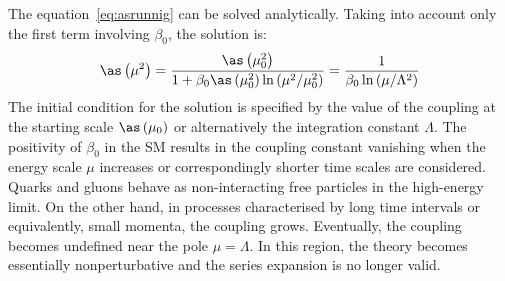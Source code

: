 The equation~\eqref{eq:asrunnig} can be solved analytically. Taking into account only the first term involving $\beta_0$, the solution is:
\begin{equation}
 \as\left(\mu^2\right) = \dfrac{ \as\left(\mu_0^2\right) }{1+\beta_0\as\left(\mu_0^2\right)\ln{\left(\mu^2/\mu_0^2\right)}} = \dfrac{1}{\beta_0\ln{\left(\mu/\Lambda^2\right)}}
\label{eq:asrunnigsolution}
\end{equation}
The initial condition for the solution is specified by the value of the coupling at the starting scale $\as\left(\mu_0\right)$ or alternatively the integration constant $\Lambda$. The positivity of $\beta_0$ in the SM results in the coupling constant vanishing when the energy scale $\mu$ increases or correspondingly shorter time scales are considered. Quarks and gluons behave as non-interacting free particles in the high-energy limit. On the other hand, in processes characterised by long time intervals or equivalently, small momenta, the coupling grows. Eventually, the coupling becomes undefined near the pole $\mu = \Lambda$. In this region, the theory becomes essentially nonperturbative and the series expansion is no longer valid. 

